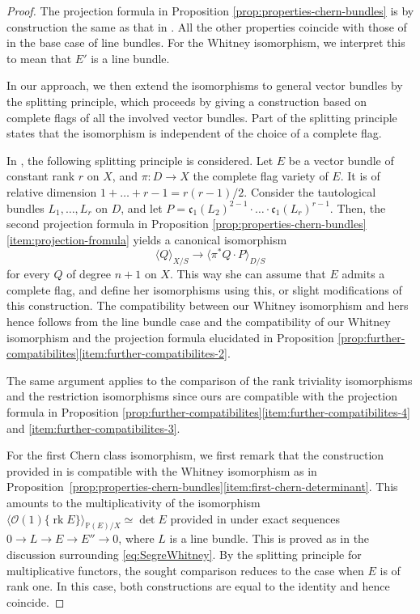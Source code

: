 \documentclass[JEP,XML,SOM,Unicode,published]{cedram}
\theoremstyle{plain}
\theoremstyle{definition}
\newcommand{\PBbb}{\mathbb P}
\newcommand{\Ocal}{\mathcal O}
\newcommand{\cfrak}{\mathfrak c}
\DeclareMathOperator{\rk}{rk}
\begin{document}
\begin{proof}
The projection formula in Proposition \ref{prop:properties-chern-bundles} is by construction the same as that in \cite{Elkikfib}. All the other properties coincide with those of \cite{Elkikfib} in the base case of line bundles. For the Whitney isomorphism, we interpret this to mean that $E'$ is a line bundle.

In our approach, we then extend the isomorphisms to general vector bundles by the splitting principle, which proceeds by giving a construction based on complete flags of all the involved vector bundles. Part of the splitting principle states that the isomorphism is independent of the choice of a complete flag.

In \cite[\textsection V.2.3]{Elkikfib}, the following splitting principle is considered. Let $E$ be a vector bundle of constant rank $r$ on $X$, and $\pi\colon D \to X$ the complete flag variety of $E$. It is of relative dimension $1 + \ldots + r-1 = r(r-1)/2$. Consider the tautological bundles $L_1, \ldots, L_{r}$ on $D$, and let $P = \cfrak_1(L_2)^{2-1}\cdot \ldots\cdot \cfrak_1(L_r)^{r-1}$. Then, the second projection formula in Proposition \ref{prop:properties-chern-bundles}\eqref{item:projection-fromula} yields a canonical isomorphism
\begin{displaymath}
\langle Q\rangle_{X/S} \to \langle\pi^{\ast} Q\cdot P\rangle_{D/S}
\end{displaymath}
for every $Q$ of degree $n+1$ on $X$. This way she can assume that $E$ admits a complete flag, and define her isomorphisms using this, or slight modifications of this construction. The compatibility between our Whitney isomorphism and hers hence follows from the line bundle case and the compatibility of our Whitney isomorphism and the projection formula elucidated in Proposition \ref{prop:further-compatibilites}\eqref{item:further-compatibilites-2}.

The same argument applies to the comparison of the rank triviality isomorphisms and the restriction isomorphisms since ours are compatible with the projection formula in Proposition \ref{prop:further-compatibilites}\eqref{item:further-compatibilites-4} and \eqref{item:further-compatibilites-3}.

For the first Chern class isomorphism, we first remark that the construction provided in \cite[\textsection V.1.2 (e)]{Elkikfib} is compatible with the Whitney isomorphism as in Proposition~\ref{prop:properties-chern-bundles}\eqref{item:first-chern-determinant}. This amounts to the multiplicativity of the isomorphism $\langle \Ocal(1)\{\rk E\} \rangle_{\PBbb(E)/X} \simeq \det E$ provided in \cite[Prop.\,IV.3]{Elkikfib} under exact sequences $0 \to L \to E \to E'' \to 0$, where $L$ is a line bundle. This is proved as in the discussion surrounding \eqref{eq:SegreWhitney}. By the splitting principle for multiplicative functors, the sought comparison reduces to the case when $E$ is of rank one. In this case, both constructions are equal to the identity and hence coincide.


\end{proof}
\end{document}
